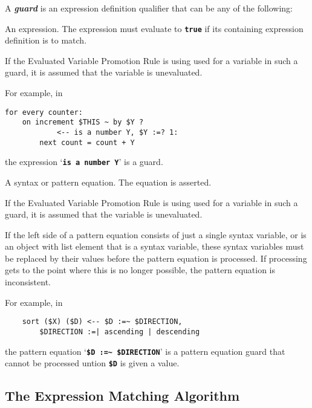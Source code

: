 \documentclass[12pt]{article}
\newcommand{\TT}[1]{{\tt \bfseries #1}}
\newcommand{\key}[1]{{\bf \em #1}\index{#1}}
\newcommand{\TILDE}{\textasciitilde}
\newenvironment{indpar}[1][0.3in]%
	{\begin{list}{}%
		     {\setlength{\itemsep}{0in}%
		      \setlength{\topsep}{0in}%
		      \setlength{\parsep}{1ex}%
		      \setlength{\labelwidth}{#1}%
		      \setlength{\leftmargin}{#1}%
		      \addtolength{\leftmargin}{\labelsep}}%
	 \item}%
	{\end{list}}
\begin{document}
A \key{guard} is an expression definition qualifier that
can be any of the following:
\begin{enumerate}
\item An expression.  The expression must evaluate
to \TT{true} if its containing expression definition is to
match.

If the Evaluated Variable Promotion Rule is using used for
a variable in such a guard, it is assumed that the variable
is unevaluated.

For example, in
\begin{indpar}\begin{verbatim}
for every counter:
    on increment $THIS ~ by $Y ?
            <-- is a number Y, $Y :=? 1:
        next count = count + Y
\end{verbatim}\end{indpar}

the expression `\TT{is a number Y}' is a guard.

\item
A syntax or pattern equation.  The equation is asserted.

If the Evaluated Variable Promotion Rule is using used for
a variable in such a guard, it is assumed that the variable
is unevaluated.

If the left side of a pattern equation consists of just a single
syntax variable, or is an object with list element that is a syntax variable,
these syntax variables must be replaced by their
values before the pattern equation is processed.
If processing gets to the point where this is no longer possible,
the pattern equation is inconsistent.

For example, in
\begin{indpar}\begin{verbatim}
    sort ($X) ($D) <-- $D :=~ $DIRECTION,
        $DIRECTION :=| ascending | descending
\end{verbatim}\end{indpar}

the pattern equation `\TT{\$D :=\TILDE{} \$DIRECTION}' is a
pattern equation guard that cannot be processed untion \TT{\$D} is
given a value.

\end{enumerate}

\subsection{The Expression Matching Algorithm}
\label{EXPRESSION-MATCHING-ALGORITHM}
\end{document}
